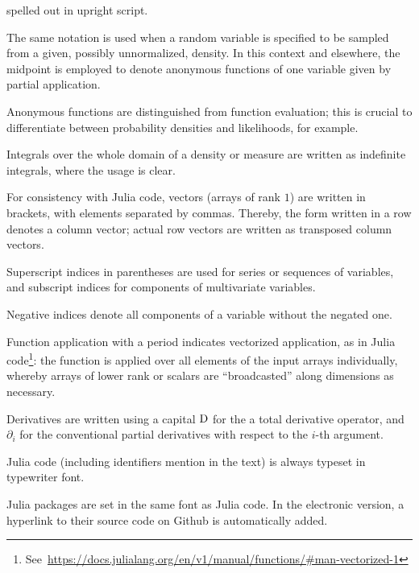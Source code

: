 \begin{symbolicfootnotes}
\begin{description}[style=nextline, leftmargin=4cm]
    spelled out in upright script.
  \item[{\(Y \from q(\cdot, X_{i-1})\)}] The same notation is used when a random variable is specified
    to be sampled from a given, possibly unnormalized, density.  In this context and elsewhere, the
    midpoint is employed to denote anonymous functions of one variable given by partial application.
  \item[{\(y \mapsto \prob{x \given y, z}\)}] Anonymous functions are distinguished from function
    evaluation; this is crucial to differentiate between probability densities and likelihoods, for
    example.
  \item[\(\int \prob{x} \dif x = 1\)] Integrals over the whole domain of a density or measure are
    written as indefinite integrals, where the usage is clear.
  \item[{\([x, y, z] = \smash[b]{\left(\begin{smallmatrix}x\\y\\z\end{smallmatrix}\right)}\)}] For
    consistency with Julia code, vectors (arrays of rank \(1\)) are written in brackets, with
    elements separated by commas.  Thereby, the form written in a row denotes a column vector;
    actual row vectors are written as transposed column vectors.
  \item[{\(\kth{\Theta} = [\kth{\Theta}_1, \ldots, \kth{\Theta}_N]\)}] Superscript indices in
    parentheses are used for series or sequences of variables, and subscript indices for components of
    multivariate variables.
  \item[{\(z_{-i} = [z_{1}, \ldots, z_{i-1}, z_{i+1}, \ldots, z_{N}]\)}] Negative indices denote all
    components of a variable without the negated one.
  \item[{\(\broadcast{f}(x, 1) = [f(x_{1}, 1), \ldots, f(x_{N}, 1)]\)}] Function application with a
    period indicates vectorized application, as in Julia
    code\footnote{See~\protect\url{https://docs.julialang.org/en/v1/manual/functions/\#man-vectorized-1}}:
    the function is applied over all elements of the input arrays individually, whereby arrays of
    lower rank or scalars are \enquote{broadcasted} along dimensions as necessary.
  \item[{\(\Dif F(x, y) = (\Delta_1, \Delta_2) \mapsto \partial_1F(x, y)\,\Delta_1 + \partial_2F(x,
      y)\,\Delta_2\)}] Derivatives are written using a capital \(\mathop{}\!\mathrm{D}\) for the a total derivative
    operator, and \(\partial_i\) for the conventional partial derivatives with respect to the
    \(i\)-th argument.
  \item[{\jlinlfont f(x) = rand(x)}] Julia code (including identifiers mention in the text) is
    always typeset in typewriter font.
  \item[{\irtrackerjl{}}] Julia packages are set in the same font as Julia code.  In the electronic
    version, a hyperlink to their source code on Github is automatically added.
  \end{description}
\end{symbolicfootnotes}

